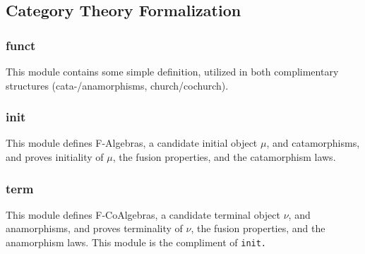 
\subsection{Category Theory Formalization}
\subsubsection{funct}
This module contains some simple definition, utilized in both complimentary structures (cata-/anamorphisms, church/cochurch).



\subsubsection{init}
This module defines F-Algebras, a candidate initial object $\mu$, and catamorphisms, and proves initiality of $\mu$, the fusion properties, and the catamorphism laws.




\subsubsection{term}
This module defines F-CoAlgebras, a candidate terminal object $\nu$, and anamorphisms, and proves terminality of $\nu$, the fusion properties, and the anamorphism laws.
This module is the compliment of \tt{init}.


